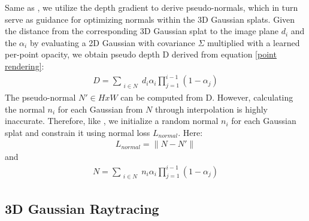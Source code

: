  Same as \cite{gao2023relightable,liang2023gsir,jin2023tensoir,zhang2021nerfactor}, we utilize the depth gradient to derive pseudo-normals, which in turn serve as guidance for optimizing normals within the 3D Gaussian splats. Given the distance from the corresponding 3D Gaussian splat to the image plane $d_i$ and the $\alpha_{i}$ by evaluating a 2D Gaussian with covariance $\Sigma$ multiplied with a learned per-point opacity, we obtain pseudo depth D derived from equation \ref{point rendering}:
\begin{align}
    D=\sum_{\substack{i\in N}}d_{i}\alpha_{i}\prod_{j=1}^{i-1}(1-\alpha_{j})
\end{align}
The pseudo-normal $N' \in HxW$ can be computed from D. 
However, calculating the normal $n_i$ for each Gaussian from 
$N$ through interpolation is highly inaccurate. Therefore, like \cite{gao2023relightable,jin2023tensoir}, we initialize a random normal $n_i$ for each Gaussian splat and constrain it using normal loss $L_{normal}$. Here:
\begin{align}
    L_{normal}=\|N-N'\| 
\end{align}
and
\begin{align}
    N=\sum_{\substack{i\in N}}n_{i}\alpha_{i}\prod_{j=1}^{i-1}(1-\alpha_{j})
\end{align}
\subsection{3D Gaussian Raytracing}\label{4.4}


